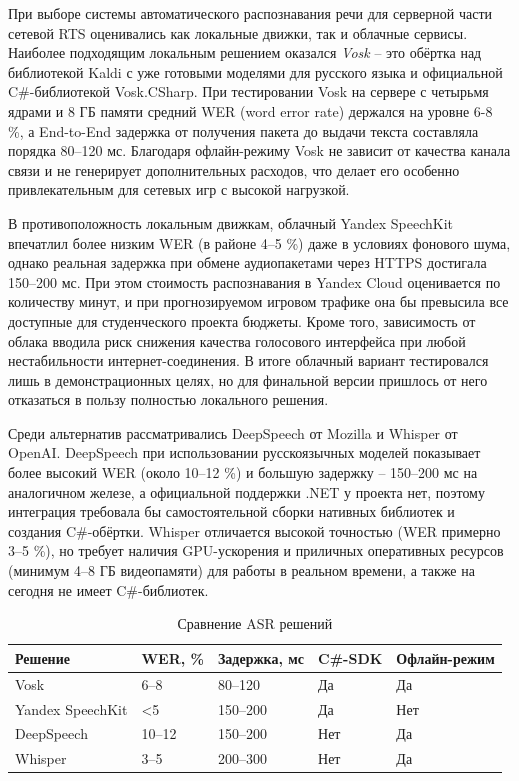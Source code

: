         При выборе системы автоматического распознавания речи для серверной части сетевой RTS оценивались как локальные движки, так и облачные сервисы. Наиболее подходящим локальным решением оказался \textit{Vosk} -- это обёртка над библиотекой Kaldi с уже готовыми моделями для русского языка и официальной C\#-библиотекой Vosk.CSharp. При тестировании Vosk на сервере с четырьмя ядрами и 8 ГБ памяти средний WER (word error rate) держался на уровне 6-8 \%, а End-to-End задержка от получения пакета до выдачи текста состав­ляла порядка 80–120 мс. Благодаря офлайн-режиму Vosk не зависит от качества канала связи и не генерирует дополнительных расходов, что делает его особенно привлекательным для сетевых игр с высокой нагрузкой.

        В противоположность локальным движкам, облачный Yandex SpeechKit впечатлил более низким WER (в районе 4–5 \%) даже в условиях фонового шума, однако реальная задержка при обмене аудиопакетами через HTTPS достигала 150–200 мс. При этом стоимость распознавания в Yandex Cloud оценивается по количеству минут, и при прогнозируемом игровом трафике она бы превысила все доступные для студенческого проекта бюджеты. Кроме того, зависимость от облака вводила риск снижения качества голосового интерфейса при любой нестабильности интернет-соединения. В итоге облачный вариант тестировался лишь в демонстрационных целях, но для финальной версии пришлось от него отказаться в пользу полностью локального решения.

        Среди альтернатив рассматривались DeepSpeech от Mozilla и Whisper от OpenAI. DeepSpeech при использовании русскоязычных моделей показывает более высокий WER (около 10–12 \%) и большую задержку -- 150–200 мс на аналогичном железе, а официальной поддержки .NET у проекта нет, поэтому интеграция требовала бы самостоятельной сборки нативных библиотек и создания C\#-обёртки. Whisper отличается высокой точностью (WER примерно 3–5 \%), но требует наличия GPU-ускорения и приличных оперативных ресурсов (минимум 4–8 ГБ видеопамяти) для работы в реальном времени, а также на сегодня не имеет C\#-библиотек.


        \begin{table}[ht]
            \caption{Сравнение ASR решений}
            \centering
            \renewcommand{\arraystretch}{1.2}
            \renewcommand{\tablename}{Табл.}
            \begin{tabularx}{\textwidth}{|X|X|X|X|X|}
            \hline
            \textbf{Решение} & \textbf{WER, \%} & \textbf{Задержка, мс} & \textbf{C\#-SDK} & \textbf{Офлайн-режим} \\
            \hline
            Vosk&6–8&80–120&Да&Да \\
            \hline
            Yandex SpeechKit&<5&150–200&Да&Нет \\
            \hline
            DeepSpeech&10–12&150–200&Нет&Да\\
            \hline
            Whisper&3–5&200–300&Нет&Да\\
            \hline
            \end{tabularx}
        \end{table}

